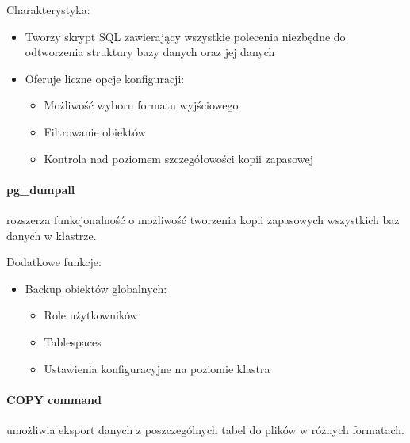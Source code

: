 \documentclass[letterpaper,10pt,polish]{sphinxmanual}
\begin{document}
\sphinxAtStartPar
Charakterystyka:
\begin{itemize}
\item {} 
\sphinxAtStartPar
Tworzy skrypt SQL zawierający wszystkie polecenia niezbędne do odtworzenia struktury bazy danych oraz jej danych

\item {} 
\sphinxAtStartPar
Oferuje liczne opcje konfiguracji:
\begin{itemize}
\item {} 
\sphinxAtStartPar
Możliwość wyboru formatu wyjściowego

\item {} 
\sphinxAtStartPar
Filtrowanie obiektów

\item {} 
\sphinxAtStartPar
Kontrola nad poziomem szczegółowości kopii zapasowej

\end{itemize}

\end{itemize}


\paragraph{pg\_dumpall}
\label{\detokenize{rozdzial2/Kopie_zapasowe_i_odzyskiwanie_danych/kopie_zapasowe_i_odzyskiwanie_danych:pg-dumpall}}
\sphinxAtStartPar
{} rozszerza funkcjonalność  o możliwość tworzenia kopii zapasowych wszystkich baz danych w klastrze.

\sphinxAtStartPar
Dodatkowe funkcje:
\begin{itemize}
\item {} 
\sphinxAtStartPar
Backup obiektów globalnych:
\begin{itemize}
\item {} 
\sphinxAtStartPar
Role użytkowników

\item {} 
\sphinxAtStartPar
Tablespaces

\item {} 
\sphinxAtStartPar
Ustawienia konfiguracyjne na poziomie klastra

\end{itemize}

\end{itemize}


\paragraph{COPY command}
\label{\detokenize{rozdzial2/Kopie_zapasowe_i_odzyskiwanie_danych/kopie_zapasowe_i_odzyskiwanie_danych:copy-command}}
\sphinxAtStartPar
{} umożliwia eksport danych z poszczególnych tabel do plików w różnych formatach.
\end{document}
